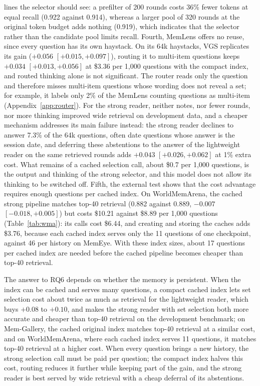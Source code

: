 lines the selector should see: a prefilter of 200 rounds costs 36\% fewer tokens at equal recall (0.922 against 0.914), whereas a larger pool of 320 rounds at the original token budget adds nothing (0.919), which indicates that the selector rather than the candidate pool limits recall. Fourth, MemLens offers no reuse, since every question has its own haystack. On its 64k haystacks, VGS replicates its gain ($+0.056$ $[+0.015, +0.097]$), routing it to multi-item questions keeps $+0.034$ $[+0.013, +0.056]$ at \$3.36 per 1,000 questions with the compact index, and routed thinking alone is not significant. The router reads only the question and therefore misses multi-item questions whose wording does not reveal a set; for example, it labels only 2\% of the MemLens counting questions as multi-item (Appendix~\ref{app:router}). For the strong reader, neither notes, nor fewer rounds, nor more thinking improved wide retrieval on development data, and a cheaper mechanism addresses its main failure instead: the strong reader declines to answer 7.3\% of the 64k questions, often date questions whose answer is the session date, and deferring these abstentions to the answer of the lightweight reader on the same retrieved rounds adds $+0.043$ $[+0.026, +0.062]$ at 1\% extra cost. What remains of a cached selection call, about \$0.7 per 1,000 questions, is the output and thinking of the strong selector, and this model does not allow its thinking to be switched off. Fifth, the external test shows that the cost advantage requires enough questions per cached index. On WorldMemArena, the cached strong pipeline matches top-40 retrieval (0.882 against 0.889, $-0.007$ $[-0.018, +0.005]$) but costs \$10.21 against \$8.89 per 1,000 questions (Table~\ref{tab:wma}): its calls cost \$6.44, and creating and storing the caches adds \$3.76, because each cached index serves only the 11 questions of one checkpoint, against 46 per history on MemEye. With these index sizes, about 17 questions per cached index are needed before the cached pipeline becomes cheaper than top-40 retrieval.

The answer to RQ6 depends on whether the memory is persistent. When the index can be cached and serves many questions, a compact cached index lets set selection cost about twice as much as retrieval for the lightweight reader, which buys $+0.08$ to $+0.10$, and makes the strong reader with set selection both more accurate and cheaper than top-40 retrieval on the development benchmark; on Mem-Gallery, the cached original index matches top-40 retrieval at a similar cost, and on WorldMemArena, where each cached index serves 11 questions, it matches top-40 retrieval at a higher cost. When every question brings a new history, the strong selection call must be paid per question; the compact index halves this cost, routing reduces it further while keeping part of the gain, and the strong reader is best served by wide retrieval with a cheap deferral of its abstentions.
